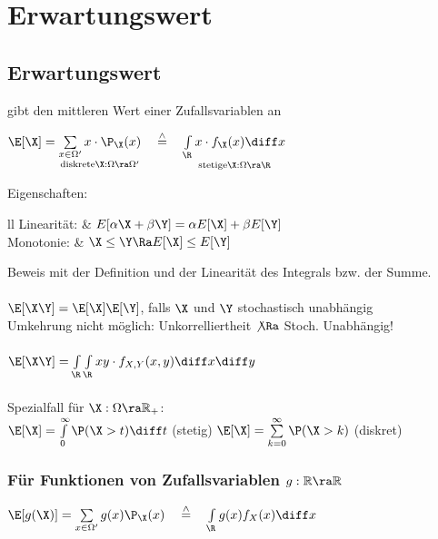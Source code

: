 \documentclass[german,color,6pt]{latex4ei/latex4ei_sheet}
\begin{document}
\columnbreak
\section{Erwartungswert}
\begin{sectionbox}
	\subsection{Erwartungswert}
	gibt den mittleren Wert einer Zufallsvariablen an

	\begin{emphbox}
		$\E [\X] = \underset{\text{diskrete} \X:\Omega \ra \Omega'}{\sum\limits_{x \in \Omega'} x \cdot \P_{\X}(x)} \quad \stackrel{\wedge}{=}\quad \underset{\text{stetige} \X: \Omega \ra \R}{\int \limits_{\R} x \cdot f_{\X} (x) \diff x}$
	\end{emphbox}
	Eigenschaften:
	\begin{tablebox}{ll}
		Linearität: &
		$E[\alpha \X + \beta \Y] = \alpha E [\X] + \beta E[\Y]$ \\
		Monotonie: &
		$\X \le \Y \Ra E[\X] \le E[\Y]$ \\
	\end{tablebox}
	Beweis mit der Definition und der Linearität des Integrals bzw. der Summe. \\
	\\
	$\E[\X\Y] = \E[\X] \E[\Y]$, falls $\X$ und $\Y$ stochastisch unabhängig\\
	Umkehrung nicht möglich: Unkorrelliertheit $\not \Ra$ Stoch. Unabhängig! \\
	\\
	$\E[\X\Y]= \int \limits_{\R}\int \limits_{\R}  xy \cdot f_{X,Y} (x,y) \diff x \diff y$\\
	\\
	Spezialfall für $\X: \Omega \ra \mathbb R_+$: \\
	$\E[\X] = \int \limits_0^\infty \P(\X > t) \diff t$ (stetig) \qquad $\E[\X] = \sum \limits_{k=0}^{\infty} \P(\X >k)$ (diskret)

	\subsubsection{Für Funktionen von Zufallsvariablen $g: \mathbb R \ra \mathbb R$}
	$\E[g(\X)] = \sum \limits_{x \in \Omega'} g(x) \P_{\X} (x)\quad \stackrel{\wedge}{=}\quad \int \limits_{\R} g(x) f_X (x) \diff x$
\end{sectionbox}
\end{document}
